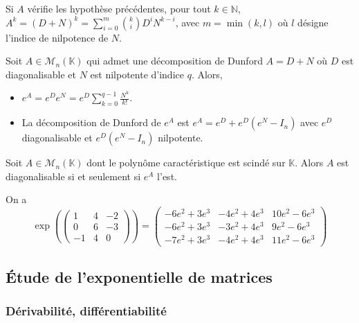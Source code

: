   \begin{corollary}
    Si $A$ vérifie les hypothèse précédentes, pour tout $k \in \mathbb{N}$, $A^k = (D + N)^k = \sum_{i=0}^m \binom{k}{i} D^i N^{k-i}$, avec $m = \min(k, l)$ où $l$ désigne l'indice de nilpotence de $N$.
  \end{corollary}


  \begin{example}
    Soit $A \in \mathcal{M}_n(\mathbb{K})$ qui admet une décomposition de Dunford $A = D+N$ où $D$ est diagonalisable et $N$ est nilpotente d'indice $q$. Alors,
    \begin{itemize}
      \item $e^A = e^D e^N = e^D \sum_{k=0}^{q-1} \frac{N^k}{k!}$.
      \item La décomposition de Dunford de $e^A$ est $e^A = e^D + e^D(e^N - I_n)$ avec $e^D$ diagonalisable et $e^D(e^N - I_n)$ nilpotente.
    \end{itemize}
  \end{example}

  \begin{application}
    Soit $A \in \mathcal{M}_n(\mathbb{K})$ dont le polynôme caractéristique est scindé sur $\mathbb{K}$. Alors $A$ est diagonalisable si et seulement si $e^A$ l'est.
  \end{application}


  \begin{example}
    On a
    \[ \exp \left( \begin{pmatrix} 1 & 4 & -2 \\ 0 & 6 & -3 \\ -1 & 4 & 0 \end{pmatrix} \right) = \begin{pmatrix} -6e^2 + 3e^3 & -4e^2 + 4e^3 & 10e^2 - 6e^3 \\ -6e^2 + 3e^3 & -3e^2 + 4e^3 & 9e^2 - 6e^3 \\ -7e^2 + 3e^3 & -4e^2 + 4e^3 & 11e^2 - 6e^3 \end{pmatrix} \]
  \end{example}

  \subsection{Étude de l'exponentielle de matrices}

  \subsubsection{Dérivabilité, différentiabilité}

